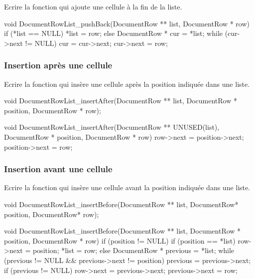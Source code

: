 Ecrire la fonction  qui a\-jou\-te une cellule à la fin de la liste.

\begin{csourcecorrection}
void DocumentRowList_pushBack(DocumentRow ** list, DocumentRow * row) {
    if (*list == NULL)
        *list = row;
    else {
        DocumentRow * cur = *list;
        while (cur->next != NULL)
            cur = cur->next;
        cur->next = row;
    }
}
\end{csourcecorrection}

\subsubsection{Insertion après une cellule}

Ecrire la fonction  qui insère une cellule après la position indiquée dans une liste.
\begin{csource}
void DocumentRowList_insertAfter(DocumentRow ** list, DocumentRow * position, DocumentRow * row);
\end{csource}

\begin{csourcecorrection}
void DocumentRowList_insertAfter(DocumentRow ** UNUSED(list), DocumentRow * position,
        DocumentRow * row) {
    row->next = position->next;
    position->next = row;
}
\end{csourcecorrection}

\subsubsection{Insertion avant une cellule}

Ecrire la fonction  qui insère une cellule avant la position indiquée dans une liste.
\begin{csource}
void DocumentRowList_insertBefore(DocumentRow ** list, DocumentRow* position, DocumentRow* row);
\end{csource}

\begin{csourcecorrection}
void DocumentRowList_insertBefore(DocumentRow ** list, DocumentRow * position, DocumentRow * row) {
    if (position != NULL) {
        if (position == *list) {
            row->next = position;
            *list = row;
        } else {
            DocumentRow * previous = *list;
            while (previous != NULL && previous->next != position)
                previous = previous->next;
            if (previous != NULL) {
                row->next = previous->next;
                previous->next = row;
            }
        }
    }
}
\end{csourcecorrection}


